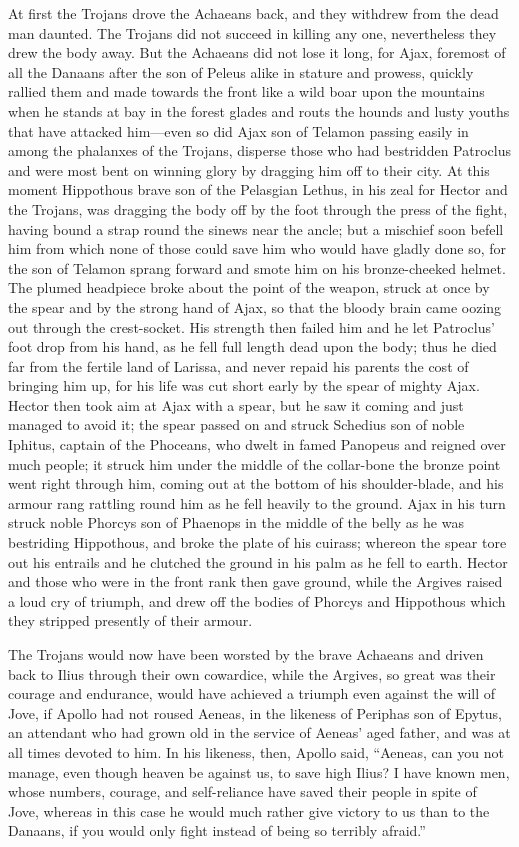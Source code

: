 At first the Trojans drove the Achaeans back, and they withdrew from the
dead man daunted. The Trojans did not succeed in killing any one,
nevertheless they drew the body away. But the Achaeans did not lose it
long, for Ajax, foremost of all the Danaans after the son of Peleus alike
in stature and prowess, quickly rallied them and made towards the front
like a wild boar upon the mountains when he stands at bay in the forest
glades and routs the hounds and lusty youths that have attacked him—even
so did Ajax son of Telamon passing easily in among the phalanxes of the
Trojans, disperse those who had bestridden Patroclus and were most bent on
winning glory by dragging him off to their city. At this moment Hippothous
brave son of the Pelasgian Lethus, in his zeal for Hector and the Trojans,
was dragging the body off by the foot through the press of the fight,
having bound a strap round the sinews near the ancle; but a mischief soon
befell him from which none of those could save him who would have gladly
done so, for the son of Telamon sprang forward and smote him on his
bronze-cheeked helmet. The plumed headpiece broke about the point of the
weapon, struck at once by the spear and by the strong hand of Ajax, so
that the bloody brain came oozing out through the crest-socket. His
strength then failed him and he let Patroclus’ foot drop from his hand, as
he fell full length dead upon the body; thus he died far from the fertile
land of Larissa, and never repaid his parents the cost of bringing him up,
for his life was cut short early by the spear of mighty Ajax. Hector then
took aim at Ajax with a spear, but he saw it coming and just managed to
avoid it; the spear passed on and struck Schedius son of noble Iphitus,
captain of the Phoceans, who dwelt in famed Panopeus and reigned over much
people; it struck him under the middle of the collar-bone the bronze point
went right through him, coming out at the bottom of his shoulder-blade,
and his armour rang rattling round him as he fell heavily to the ground.
Ajax in his turn struck noble Phorcys son of Phaenops in the middle of the
belly as he was bestriding Hippothous, and broke the plate of his cuirass;
whereon the spear tore out his entrails and he clutched the ground in his
palm as he fell to earth. Hector and those who were in the front rank then
gave ground, while the Argives raised a loud cry of triumph, and drew off
the bodies of Phorcys and Hippothous which they stripped presently of
their armour.

The Trojans would now have been worsted by the brave Achaeans and driven
back to Ilius through their own cowardice, while the Argives, so great was
their courage and endurance, would have achieved a triumph even against
the will of Jove, if Apollo had not roused Aeneas, in the likeness of
Periphas son of Epytus, an attendant who had grown old in the service of
Aeneas’ aged father, and was at all times devoted to him. In his likeness,
then, Apollo said, “Aeneas, can you not manage, even though heaven be
against us, to save high Ilius? I have known men, whose numbers, courage,
and self-reliance have saved their people in spite of Jove, whereas in
this case he would much rather give victory to us than to the Danaans, if
you would only fight instead of being so terribly afraid.”

